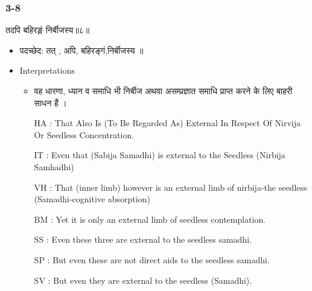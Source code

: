 \begin{frame}[fragile]\frametitle{3-8}
\begin{sanskrit}
तदपि बहिरङ्गं निर्बीजस्य॥८॥
\end{sanskrit}

	\begin{itemize}
	\item पदच्छेद:  तत् , अपि, बहिरङ्गं,निर्बीजस्य ॥
	\item Interpretations
		\begin{itemize}	
		\item वह धारणा, ध्यान व समाधि भी निर्बीज अथवा असम्प्रज्ञात समाधि प्राप्त करने के लिए बाहरी साधन हैं ।
		\item [HA]: That Also Is (To Be Regarded As) External In Respect Of Nirvija Or Seedless Concentration.
		\item [IT]: Even that (Sabija Samadhi) is external to the Seedless (Nirbija Samhadhi)
		\item [VH]: That (inner limb) however is an external limb of nirbija-the seedless (Samadhi-cognitive absorption)
		\item [BM]: Yet it is only an external limb of seedless contemplation.
		\item [SS]: Even these three are external to the seedless samadhi.
		\item [SP]: But even these are not direct aids to the seedless samadhi.
		\item [SV]: But even they are external to the seedless (Samadhi). 
		\end{itemize}
	\end{itemize}
\end{frame}


